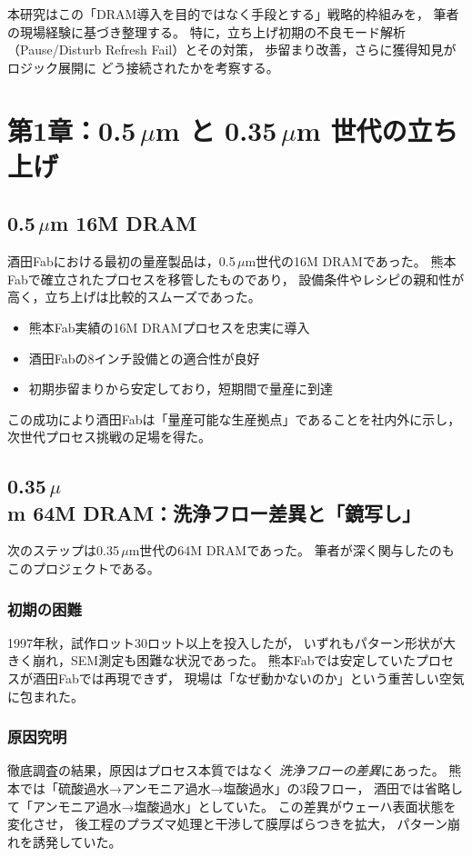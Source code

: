 \documentclass[conference]{IEEEtran}
\begin{document}
本研究はこの「DRAM導入を目的ではなく手段とする」戦略的枠組みを，
筆者の現場経験に基づき整理する。
特に，立ち上げ初期の不良モード解析（Pause/Disturb Refresh Fail）とその対策，
歩留まり改善，さらに獲得知見がロジック展開に
どう接続されたかを考察する。

\section{第1章：0.5\,\texorpdfstring{$\mu$m}{μm} と 0.35\,\texorpdfstring{$\mu$m}{μm} 世代の立ち上げ}

\subsection{0.5\,$\mu$m 16M DRAM}
酒田Fabにおける最初の量産製品は，0.5\,$\mu$m世代の16M DRAMであった。
熊本Fabで確立されたプロセスを移管したものであり，
設備条件やレシピの親和性が高く，立ち上げは比較的スムーズであった。

\begin{itemize}
  \item 熊本Fab実績の16M DRAMプロセスを忠実に導入
  \item 酒田Fabの8インチ設備との適合性が良好
  \item 初期歩留まりから安定しており，短期間で量産に到達
\end{itemize}

この成功により酒田Fabは「量産可能な生産拠点」であることを社内外に示し，
次世代プロセス挑戦の足場を得た。

\subsection{0.35\,$\mu$m 64M DRAM：洗浄フロー差異と「鏡写し」}
次のステップは0.35\,$\mu$m世代の64M DRAMであった。
筆者が深く関与したのもこのプロジェクトである。

\subsubsection{初期の困難}
1997年秋，試作ロット30ロット以上を投入したが，
いずれもパターン形状が大きく崩れ，SEM測定も困難な状況であった。
熊本Fabでは安定していたプロセスが酒田Fabでは再現できず，
現場は「なぜ動かないのか」という重苦しい空気に包まれた。

\subsubsection{原因究明}
徹底調査の結果，原因はプロセス本質ではなく
\emph{洗浄フローの差異}にあった。
熊本では「硫酸過水→アンモニア過水→塩酸過水」の3段フロー，
酒田では省略して「アンモニア過水→塩酸過水」としていた。
この差異がウェーハ表面状態を変化させ，
後工程のプラズマ処理と干渉して膜厚ばらつきを拡大，
パターン崩れを誘発していた。
\end{document}
